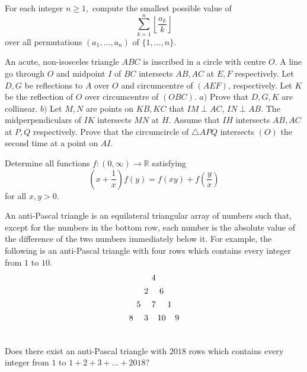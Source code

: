 \documentclass[11pt]{scrartcl}
\begin{document}
\begin{problem}[161342796381450]
For each integer $n\ge 1,$ compute the smallest possible value of\[\sum_{k=1}^{n}\left\lfloor\frac{a_k}{k}\right\rfloor\]over all permutations $(a_1,\dots,a_n)$ of $\{1,\dots,n\}.$
\end{problem}
\begin{problem}[796349431725149]
An acute, non-isosceles triangle $ABC$ is inscribed in a circle with centre $O$. A line go through $O$ and midpoint $I$ of $BC$ intersects $AB, AC$ at $E, F$ respectively. Let $D, G$ be reflections to $A$ over $O$ and circumcentre of $(AEF)$, respectively. Let $K$ be the reflection of $O$ over circumcentre of $(OBC)$.
$a)$ Prove that $D, G, K$ are collinear.
$b)$ Let $M, N$ are points on $KB, KC$ that $IM\perp AC$, $IN\perp AB$. The midperpendiculars of $IK$ intersects $MN$ at $H$. Assume that $IH$ intersects $AB, AC$ at $P, Q$ respectively. Prove that the circumcircle of $\triangle APQ$ intersects $(O)$ the second time at a point on $AI$.
\end{problem}
\begin{problem}[5514383858686655851]
Determine all functions $f:(0,\infty)\to\mathbb{R}$ satisfying$$\left(x+\frac{1}{x}\right)f(y)=f(xy)+f\left(\frac{y}{x}\right)$$for all $x,y>0$.
\end{problem}
\begin{problem}[7494618588207758150]
	An anti-Pascal triangle is an equilateral triangular array of numbers such that, except for the numbers in the bottom row, each number is the absolute value of the difference of the two numbers immediately below it. For example, the following is an anti-Pascal triangle with four rows which contains every integer from $1$ to $10$.
\[\begin{array}{
c@{\hspace{4pt}}c@{\hspace{4pt}}
c@{\hspace{4pt}}c@{\hspace{2pt}}c@{\hspace{2pt}}c@{\hspace{4pt}}c
} \vspace{4pt}
 & & & 4 & & &  \\\vspace{4pt}
 & & 2 & & 6 & &  \\\vspace{4pt}
 & 5 & & 7 & & 1 & \\\vspace{4pt}
 8 & & 3 & & 10 & & 9 \\\vspace{4pt}
\end{array}\]Does there exist an anti-Pascal triangle with $2018$ rows which contains every integer from $1$ to $1 + 2 + 3 + \dots + 2018$?

\end{problem}
\end{document}
